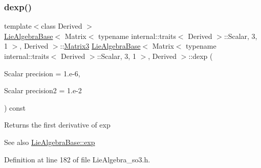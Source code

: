 \subsubsection{\texorpdfstring{dexp()}{dexp()}}
{\footnotesize\ttfamily template$<$class Derived $>$ \\
\hyperlink{class_lie_algebra_base}{Lie\+Algebra\+Base}$<$ Matrix$<$ typename internal\+::traits$<$ Derived $>$\+::Scalar, 3, 1 $>$, Derived $>$\+::\hyperlink{class_lie_algebra_base_3_01_matrix_3_01typename_01internal_1_1traits_3_01_derived_01_4_1_1_scalabfa0bdce6d9781ee940346c3f6d91f4e_a76b0bda7b6a5390a434df96474c582db}{Matrix3} \hyperlink{class_lie_algebra_base}{Lie\+Algebra\+Base}$<$ Matrix$<$ typename internal\+::traits$<$ Derived $>$\+::Scalar, 3, 1 $>$, Derived $>$\+::dexp (\begin{DoxyParamCaption}\item[{Scalar}]{precision = {\ttfamily 1.e-\/6},  }\item[{Scalar}]{precision2 = {\ttfamily 1.e-\/2} }\end{DoxyParamCaption}) const\hspace{0.3cm}{\ttfamily [inline]}}

\begin{DoxyReturn}{Returns}
the first derivative of exp 
\end{DoxyReturn}
\begin{DoxySeeAlso}{See also}
\hyperlink{class_lie_algebra_base_aafe7d43a29d43aed54dd91b3a3a4c9f7}{Lie\+Algebra\+Base\+::exp} 
\end{DoxySeeAlso}


Definition at line 182 of file Lie\+Algebra\+\_\+so3.\+h.

\hypertarget{class_lie_algebra_base_3_01_matrix_3_01typename_01internal_1_1traits_3_01_derived_01_4_1_1_scalabfa0bdce6d9781ee940346c3f6d91f4e_ae6f9ae43344c5314bb25ffd8d9df3b6b}{}\label{class_lie_algebra_base_3_01_matrix_3_01typename_01internal_1_1traits_3_01_derived_01_4_1_1_scalabfa0bdce6d9781ee940346c3f6d91f4e_ae6f9ae43344c5314bb25ffd8d9df3b6b} 
